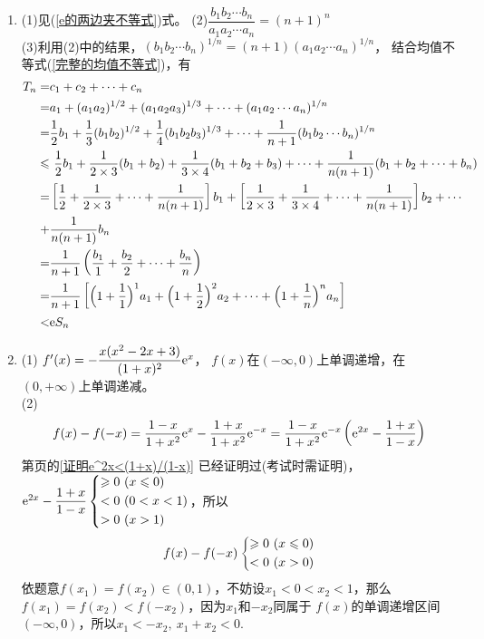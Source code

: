 \begin{enumerate}[label={\textbf{\arabic*.}},leftmargin=
    \inteval{\myenumleftmargin}pt]
\item 
(1)见(\ref{e的两边夹不等式})式。 \quad (2)$ \dfrac{b_1b_2\cdots b_n}{a_1a_2\cdots a_n}=(n+1)^n $  \\
(3)利用(2)中的结果，$ (b_1b_2\cdots b_n)^{1/n}=(n+1)(a_1a_2\cdots a_n)^{1/n} $，
结合均值不等式(\ref{完整的均值不等式})，有
\begin{align*}
    T_n=&c_1+c_2+\cdots +c_n \\
    =&a_1+(a_1a_2)^{1/2}+(a_1a_2a_3)^{1/3}+\cdots + (a_1a_2\cdots a_n)^{1/n}\\
    =&\dfrac{1}{2}b_1+\dfrac{1}{3}(b_1b_2)^{1/2}+\dfrac{1}{4}(b_1b_2b_3)^{1/3}+
    \cdots+\dfrac{1}{n+1}(b_1b_2\cdots b_n)^{1/n} \\
    \leq &\ \dfrac{1}{2}b_1+\dfrac{1}{2\times 3}(b_1+b_2)+\dfrac{1}{3\times 4}(b_1+
    b_2+b_3)+\cdots +\dfrac{1}{n(n+1)}(b_1+b_2+\cdots +b_n) \\
    =&\left[\dfrac{1}{2}+\dfrac{1}{2\times 3}+\cdots+\dfrac{1}{n(n+1)}\right]b_1+
    \left[\dfrac{1}{2\times 3}+\dfrac{1}{3\times 4}+\cdots+\dfrac{1}{n(n+1)}\right]b_2+
    \cdots\\
    +&\dfrac{1}{n(n+1)}b_n \\
    =&\dfrac{1}{n+1}\left(\dfrac{b_1}{1}+\dfrac{b_2}{2}+\cdots+\dfrac{b_n}{n}\right) \\
    =&\dfrac{1}{n+1}\left[\Big(1+\dfrac{1}{1}\Big)^1 a_1+\Big(1+\dfrac{1}{2}\Big)^2 a_2+\cdots+\Big(1+\dfrac{1}{n}\Big)^n a_n \right] \\
    <& \e S_n
\end{align*}

\item (1) $ f'(x)=-\dfrac{x(x^2-2x+3)}{(1+x)^2}\e^x $，
$ f(x) $在$ (-\infty,0) $上单调递增，在$ (0,+\infty) $上单调递减。\\
(2) 
\begin{align*}
    f(x)-f(-x)=\dfrac{1-x}{1+x^2}\e^x-\dfrac{1+x}{1+x^2}\e^{-x}=
    \dfrac{1-x}{1+x^2}\e^{-x}\left(\e^{2x}-\dfrac{1+x}{1-x}\right)
\end{align*}
第\pageref{证明e^2x<(1+x)/(1-x)}页的\ref{证明e^2x<(1+x)/(1-x)}
已经证明过(考试时需证明)，$ \e^{2x}-\dfrac{1+x}{1-x}
\begin{dcases}
    \geq 0\ (x\leq 0) \\
    < 0\ (0<x<1) \\
    > 0\ (x>1)
\end{dcases}$，所以
\begin{gather*}
    f(x)-f(-x) \begin{dcases}
        \geq 0\ (x\leq 0) \\
        <0 \ (x>0) 
    \end{dcases}
\end{gather*}
依题意$ f(x_1)=f(x_2)\in (0,1) $，不妨设$ x_1<0<x_2<1 $，那么
$ f(x_1)=f(x_2)<f(-x_2) $，因为$ x_1 $和$ -x_2 $同属于
$ f(x) $的单调递增区间$ (-\infty,0) $，所以$ x_1<-x_2,\ x_1+x_2<0 $.


\end{enumerate}
